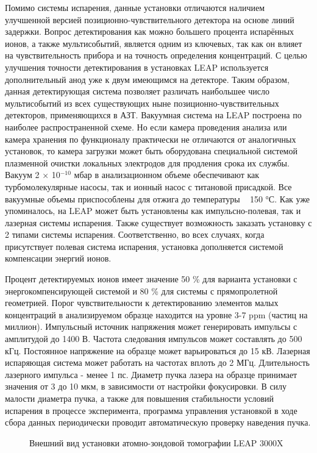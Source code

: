 Помимо системы испарения, данные установки отличаются наличием улучшенной версией позиционно-чувствительного детектора на основе линий задержки. Вопрос детектирования как можно большего процента испарённых ионов, а также мультисобытий, является одним из ключевых, так как он влияет на чувствительность прибора и на точность определения концентраций. С целью улучшения точности детектирования в установках LEAP используется дополнительный анод уже к двум имеющимся на детекторе. Таким образом, данная детектирующая система позволяет различать наибольшее число мультисобытий из всех существующих ныне позиционно-чувствительных детекторов, применяющихся в АЗТ.
Вакуумная система на LEAP построена по наиболее распространенной схеме. Но если камера проведения анализа или камера хранения по функционалу практически не отличаются от аналогичных установок, то камера загрузки может быть оборудована специальной системой плазменной очистки локальных электродов для продления срока их службы. Вакуум 2 × 10$^{-10}$ мбар в анализационном объеме обеспечивают как турбомолекулярные насосы, так и ионный насос с титановой присадкой. Все вакуумные объемы приспособлены для отжига до температуры ~ 150 °С.
Как уже упоминалось, на LEAP может быть установлены как импульсно-полевая, так и лазерная системы испарения. Также существует возможность заказать установку с 2 типами системы испарения. Соответственно, во всех случаях, когда присутствует полевая система испарения, установка дополняется системой компенсации энергий ионов.

Процент детектируемых ионов имеет значение 50 \% для варианта установки с энергокомпенсирующей системой и 80 \% для системы с прямопролетной геометрией. Порог чувствительности к детектированию элементов малых концентраций в анализируемом образце находится на уровне 3-7 ppm (частиц на миллион).
Импульсный источник напряжения может генерировать импульсы с амплитудой до 1400 В. Частота следования импульсов может составлять до 500 кГц. Постоянное напряжение на образце может варьироваться до 15 кВ. Лазерная испаряющая система может работать на частотах вплоть до 2 МГц.
Длительность лазерного импульса - менее 1 пс. Диаметр пучка лазера на образце принимает значения от 3 до 10 мкм, в зависимости от настройки фокусировки. В силу малости диаметра пучка, а также для повышения стабильности условий испарения в процессе эксперимента, программа управления установкой в ходе сбора данных периодически проводит автоматическую проверку наведения пучка.

\begin{figure}[htb]
	\caption{Внешний вид установки атомно-зондовой томографии LEAP 3000X}
	\label{fig:leap3000}
\end{figure}

